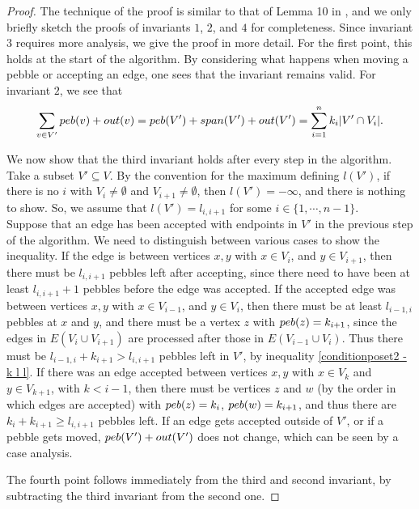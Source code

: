 \documentclass{article}
\begin{document}
\begin{proof}
    The technique of the proof is similar to that of Lemma 10 in \cite{LEE20081425}, and we only briefly sketch the proofs of invariants $1$, $2$, and $4$ for completeness. Since invariant $3$ requires more analysis, we give the proof in more detail. 
    For the first point, this holds at the start of the algorithm. By considering what happens when moving a pebble or accepting an edge, one sees that the invariant remains valid. For invariant $2$, we see that $$\sum_{v\in V'} \peb(v) + \out(v) = \peb(V') + \spa(V') +\out(V') = \sum_{i=1}^{n} k_i \vert V' \cap V_i \vert.$$
    
     We now show that the third invariant holds after every step in the algorithm. Take a subset $V' \subseteq V$. By the convention for the maximum defining $l(V')$, if there is no $i$ with $V_{i}\neq \emptyset$ and $V_{i+1} \neq \emptyset$, then $l(V')=-\infty$, and there is nothing to show. So, we assume that $l(V')=l_{i, i+1}$ for some $i\in \{1,\cdots, n-1\}$.\\
    Suppose that an edge has been accepted with endpoints in $V'$ in the previous step of the algorithm. We need to distinguish between various cases to show the inequality. If the edge is between vertices $x,y$ with $x\in V_{i}$, and $y\in V_{i+1}$, then there must be $l_{i,i+1}$ pebbles left after accepting, since there need to have been at least $l_{i, i+1} +1$ pebbles before the edge was accepted. If the accepted edge was between vertices $x,y$ with $x\in V_{i-1}$, and $y\in V_i$, then there must be at least $l_{i-1,i}$ pebbles at $x$ and $y$, and there must be a vertex $z$ with $\peb(z) =k_{i+1}$, since the edges in $E(V_i\cup V_{i+1})$ are processed after those in $E(V_{i-1}\cup V_{i})$. Thus there must be $l_{i-1,i} + k_{i+1} > l_{i,i+1}$ pebbles left in $V'$, by inequality \eqref{conditionposet2 - k l l}. If there was an edge accepted between vertices $x,y$ with $x \in V_{k}$ and $y \in V_{k+1}$, with $k< i-1$, then there must be vertices $z$ and $w$ (by the order in which edges are accepted) with $\peb(z) =k_{i}$, $\peb(w) =k_{i+1}$, and thus there are $k_i + k_{i+1}\geq l_{i,i+1}$ pebbles left. If an edge gets accepted outside of $V'$, or if a pebble gets moved, $\peb(V') +\out(V')$ does not change, which can be seen by a case analysis.
    
    The fourth point follows immediately from the third and second invariant, by subtracting the third invariant from the second one.
\end{proof}
\end{document}
